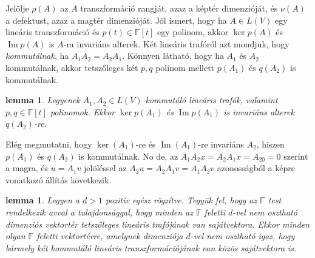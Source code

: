 \documentclass[9pt, showtrims]{memoir}
\makeatletter
\renewenvironment{proof}[1][\proofname]
    {\par\pushQED{\qed}%
    \normalfont \topsep6\p@\@plus6\p@\relax
    \trivlist
    \item[\hskip\labelsep
        \itshape
    #1\@addpunct{:}]\ignorespaces}
    {\popQED\endtrivlist\@endpefalse}
\theoremstyle{plain}
\newtheorem{lemma}[proposition]{lemma}
\theoremstyle{remark}
\theoremstyle{definition}
\makeatother
\begin{document}
Jelölje $\rho\left( A \right)$ az $A$ transzformáció rangját, 
azaz a képtér dimenzióját,
és $\nu\left( A \right)$ a defektust, azaz a magtér dimenzióját.
Jól ismert, hogy ha $A\in L\left( V \right)$ egy lineáris transzformáció
és $p\left( t \right)\in\mathbb{F}\left[ t \right]$ egy polinom, akkor 
$\operatorname{ker}p\left( A \right)$ és
$\operatorname{Im}p\left( A \right)$ is $A$-ra invariáns alterek.
Két lineáris trafóról azt mondjuk, hogy \emph{kommutálnak},
ha $A_1A_2=A_2A_1.$
Könnyen látható, hogy ha $A_1$ és $A_2$ kommutálnak, akkor tetszőleges két $p,q$
polinom mellett $p\left( A_1 \right)$ és $q\left( A_2 \right)$ is kommutálnak.
\begin{lemma}
    Legyenek $A_1,A_2\in L\left( V \right)$ kommutáló lineáris trafók,
    valamint $p,q\in\mathbb{F}\left[ t \right]$ polinomok.
    Ekkor $\operatorname{ker}p\left( A_1 \right)$ és
    $\operatorname{Im}p\left( A_1 \right)$ is invariáns alterek $q\left( A_2 \right)$-re.
\end{lemma}
\begin{proof}
    Elég megmutatni, hogy $\operatorname{ker}\left( A_1 \right)$-re és
    $\operatorname{Im}\left( A_1 \right)$-re invariáns $A_2$, hiszen $p\left( A_1 \right)$ 
    és $q\left( A_2 \right)$ is kommutálnak.
    No de, az
    \(
        A_1 A_2 x=A_2A_1x=A_20=0
    \)
    szerint a magra,
    és $u=A_1v$ jelöléssel az
    \(
        A_2u=A_2 A_1v =A_1A_2v 
    \)
    azonosságból a képre vonatkozó állítás következik.
\end{proof}
\begin{lemma}
    \label{le:indukcio}
    Legyen a $d>1$ pozitív egész rögzítve. 
    Tegyük fel, hogy az $\mathbb{F}$ test rendelkezik avval a tulajdonsággal,
    hogy minden az $\mathbb{F}$ feletti $d$-vel nem osztható dimenziós vektortér tetszőleges
    lineáris trafójának van sajátvektora.
    Ekkor minden olyan $\mathbb{F}$ feletti vektortérre, 
    amelynek dimenziója $d$-vel nem osztható igaz, 
    hogy bármely két kommutáló lineáris transzformációjának van közös sajátvektora is.
\end{lemma}
\end{document}
